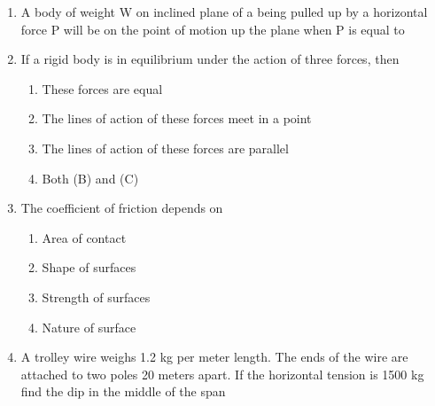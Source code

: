 \documentclass[11pt,a4paper]{article}
\begin{document}
\begin{enumerate}
\\
\item{A body of weight W on inclined plane of a being pulled up by a horizontal force P will be on the point of motion up the plane when P is equal to}
\\
\item{If a rigid body is in equilibrium under the action of three forces, then}
\begin{enumerate}[label=\Alph*.]
\item{These forces are equal}
\item{The lines of action of these forces meet in a point}
\item{The lines of action of these forces are parallel}
\item{Both (B) and (C)}
\end{enumerate}
\item{The coefficient of friction depends on}
\begin{enumerate}[label=\Alph*.]
\item{Area of contact}
\item{Shape of surfaces}
\item{Strength of surfaces}
\item{Nature of surface}
\end{enumerate}
\item{A trolley wire weighs 1.2 kg per meter length. The ends of the wire are attached to two poles 20 meters apart. If the horizontal tension is 1500 kg find the dip in the middle of the span}
\\\begin{enumerate*}[itemjoin=\qquad, label=\Alph*.]
\item{2.5 cm}
\item{3.0 cm}
\item{4.0 cm}
\item{5.0 cm}

\end{enumerate*}
\end{enumerate}
\end{document}
